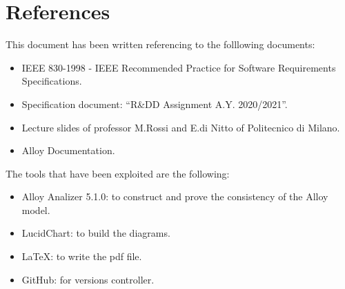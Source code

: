 \chapter{References}

This document has been written referencing to the folllowing documents: 
\begin{itemize}
	\item IEEE 830-1998 - IEEE Recommended Practice for Software Requirements Specifications.
	\item Specification document: “R\&DD Assignment A.Y. 2020/2021”.
	\item Lecture slides of professor M.Rossi and E.di Nitto of Politecnico di Milano.
	\item Alloy Documentation.
\end{itemize}
The tools that have been exploited are the following:
\begin{itemize}
	\item Alloy Analizer 5.1.0: to construct and prove the consistency of the Alloy model.
	\item LucidChart: to build the diagrams.
	\item LaTeX: to write the pdf file.
	\item GitHub: for versions controller.
\end{itemize}